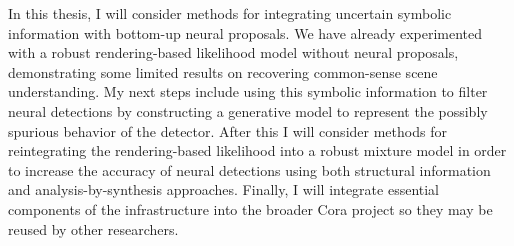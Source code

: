   In this thesis, I will consider methods for integrating uncertain symbolic
  information with bottom-up neural proposals. We have already experimented
  with a robust rendering-based likelihood model without neural proposals,
  demonstrating some limited results on recovering common-sense scene
  understanding. My next steps include using this symbolic information to
  filter neural detections by constructing a generative model to represent the
  possibly spurious behavior of the detector. After this I will consider
  methods for reintegrating the rendering-based likelihood into a robust
  mixture model in order to increase the accuracy of neural detections using
  both structural information and analysis-by-synthesis approaches. Finally, I
  will integrate essential components of the infrastructure into the broader
  Cora project so they may be reused by other researchers.
